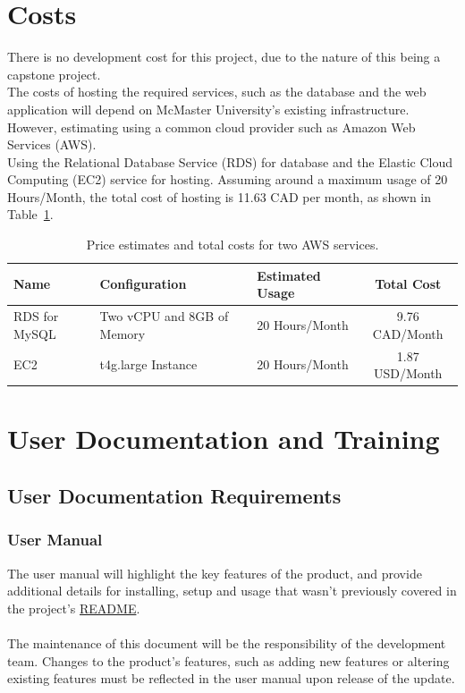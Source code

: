 \documentclass[12pt]{article}
\begin{document}
\section{Costs}
There is no development cost for this project, due to the nature of this being a capstone project. 
\\
The costs of hosting the required services, such as the database and the web application will depend on McMaster University's existing infrastructure.
\\
However, estimating using a common cloud provider such as Amazon Web Services (AWS). \\
Using the Relational Database Service (RDS) for database and the Elastic Cloud Computing (EC2) service for hosting.
Assuming around a maximum usage of 20 Hours/Month, the total cost of hosting is 11.63 CAD per month, as shown in Table~\ref{tab:price_table}.
\begin{table}[h!]
\centering
\begin{tabularx}{\textwidth}{@{} X X X c @{}}
\toprule
\textbf{Name} & \textbf{Configuration} & \textbf{Estimated Usage} & \textbf{Total Cost} \\
\midrule
RDS for MySQL & Two vCPU and 8GB of Memory & 20 Hours/Month & 9.76 CAD/Month \\ 
EC2 & t4g.large Instance & 20 Hours/Month & 1.87 USD/Month \\
\bottomrule
\end{tabularx}
\caption{Price estimates and total costs for two AWS services.}
\label{tab:price_table}
\end{table}

\section{User Documentation and Training}
\subsection{User Documentation Requirements}
\subsubsection{User Manual}
The user manual will highlight the key features of the product, and provide additional details for installing, setup and usage that wasn't previously covered in the project's \href{https://github.com/thaafei/DomainX/blob/main/README.md}{README}. \\
\\The maintenance of this document will be the responsibility of the development team. Changes to the product's features, such as adding new features or altering existing features must be reflected in the user manual upon release of the update.
\end{document}
